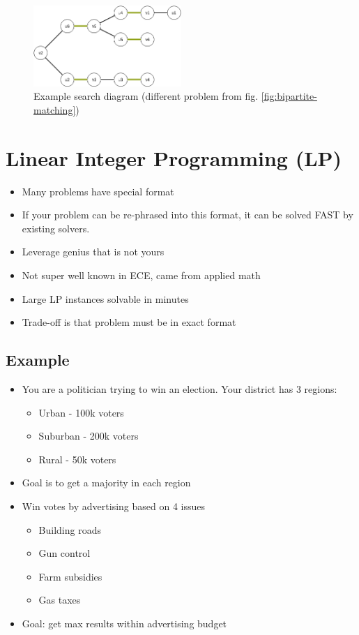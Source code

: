 \documentclass[12pt, letter]{article}
\begin{document}
\begin{figure}[h]
    \centering
    \includegraphics[width=0.5\textwidth]{search-diagram}
    \caption{Example search diagram (different problem from fig. \ref{fig:bipartite-matching})}
    \label{fig:search-diagram}
\end{figure}

\section{Linear Integer Programming (LP)}%
\label{sec:linear_integer_programming}
\begin{itemize}
    \item Many problems have special format
    \item If your problem can be re-phrased into this format, it can be solved FAST by existing solvers.
    \item Leverage genius that is not yours
    \item Not super well known in ECE, came from applied math
    \item Large LP instances solvable in minutes
    \item Trade-off is that problem must be in exact format
\end{itemize}

\subsection*{Example}
\begin{itemize}
    \item You are a politician trying to win an election. Your district has 3 regions:
    \begin{itemize}
        \item Urban - 100k voters
        \item Suburban - 200k voters
        \item Rural - 50k voters
    \end{itemize}
    \item Goal is to get a majority in each region
    \item Win votes by advertising based on 4 issues
    \begin{itemize}
        \item Building roads
        \item Gun control
        \item Farm subsidies
        \item Gas taxes
    \end{itemize}
    \item Goal: get max results within advertising budget
\end{itemize}
\end{document}
